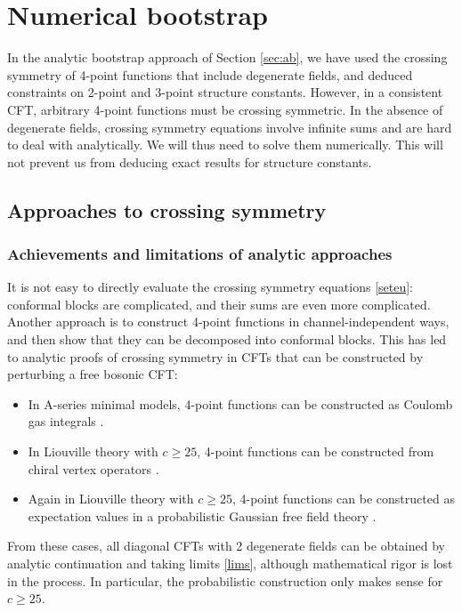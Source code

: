 \documentclass[12pt, a4paper]{article}
\theoremstyle{break}
\begin{document}
\section{Numerical bootstrap}

In the analytic bootstrap approach of Section \ref{sec:ab}, we have used the crossing symmetry of 4-point functions that include degenerate fields, and deduced constraints on 2-point and 3-point structure constants. However, in a consistent CFT, arbitrary 4-point functions must be crossing symmetric. In the absence of degenerate fields, crossing symmetry equations involve infinite sums and are hard to deal with analytically. We will thus need to solve them numerically. This will not prevent us from deducing exact results for structure constants. 

\subsection{Approaches to crossing symmetry}

\subsubsection{Achievements and limitations of analytic approaches}

It is not easy to directly evaluate the crossing symmetry equations \eqref{seteu}: conformal blocks are complicated, and their sums are even more complicated. Another approach is to construct 4-point functions in channel-independent ways, and then show that they can be decomposed into conformal blocks. This has led to analytic proofs of crossing symmetry in CFTs that can be constructed by perturbing a free bosonic CFT:
\begin{itemize}
 \item In A-series minimal models, 4-point functions can be constructed as Coulomb gas integrals \cite{df84}.
 \item In Liouville theory with $c\geq 25$, 4-point functions can be constructed from chiral vertex operators \cite{tes03b}.
 \item Again in Liouville theory with $c\geq 25$, 4-point functions can be constructed as expectation values in a probabilistic Gaussian free field theory \cite{ckrv05}. 
\end{itemize}
From these cases, all diagonal CFTs with 2 degenerate fields can be obtained by analytic continuation and taking limits \eqref{lims}, although mathematical rigor is lost in the process. In particular, the probabilistic construction only makes sense for $c\geq 25$. 
\end{document}

